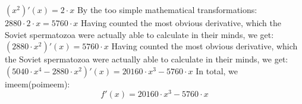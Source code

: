 \documentclass[a4paper, 12pt]{article}
\begin{document}
$({{x} ^ {2}})'(x) = {{2} \cdot {x}}$\newline
\newline
By the too simple mathematical transformations:
 ${{2880} \cdot {{2} \cdot {x}}} = {{5760} \cdot {x}}$ 
 \newline
 \newline 
Having counted the most obvious derivative, which the Soviet spermatozoa were actually able to calculate in their minds, we get:
$({{2880} \cdot {{x} ^ {2}}})'(x) = {{5760} \cdot {x}}$\newline
\newline
Having counted the most obvious derivative, which the Soviet spermatozoa were actually able to calculate in their minds, we get:
$({{{5040} \cdot {{x} ^ {4}}} - {{2880} \cdot {{x} ^ {2}}}})'(x) = {{{20160} \cdot {{x} ^ {3}}} - {{5760} \cdot {x}}}$\newline
\newline
In total, we imeem(poimeem): \newline\[f'(x) = {{{20160} \cdot {{x} ^ {3}}} - {{5760} \cdot {x}}}\]
\newline
\newline
\end{document}
